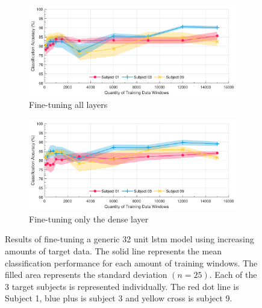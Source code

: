 \begin{figure}[p]
    \centering
    \begin{subfigure}{\textwidth}
        \centering
        \includegraphics[width=\textwidth]{content/5-Personalisation/ch5_pre_trained_model_accuracy.pdf}
        \caption{Fine-tuning all layers}
    \end{subfigure}
    \begin{subfigure}{\textwidth}
        \centering
        \includegraphics[width=\textwidth]{content/5-Personalisation/ch5_frozen_lstm_layer_accuracy.pdf}
        \caption{Fine-tuning only the dense layer}
    \end{subfigure}
    \caption[Results of fine-tuning a generic 32 unit  model using increasing amounts of target data]{Results of fine-tuning a generic 32 unit \acrshort{lstm} model using increasing amounts of target data. The solid line represents the mean classification performance for each amount of training windows. The filled area represents the standard deviation $(n=25)$. Each of the 3 target subjects is represented individually. The red dot line is Subject 1, blue plus is subject 3 and yellow cross is subject 9.}
    \label{fig:ch5_pretrained_model}
\end{figure}
